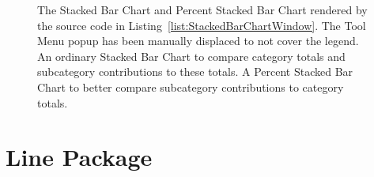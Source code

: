 \begin{figure}[tp]
\centering
{}
\hspace{1cm}
\caption[Stacked Bar Chart Window Example]{%
The Stacked Bar Chart and Percent Stacked Bar Chart rendered by the source
code in Listing~\ref{list:StackedBarChartWindow}. The Tool Menu popup has
been manually displaced to not cover the legend.
 An ordinary Stacked Bar Chart to
compare category totals and subcategory contributions to these totals.
 A Percent Stacked Bar Chart to
better compare subcategory contributions to category totals.
}
\label{fig:StackedBarChartWindow}
\end{figure}
  



\section{Line Package}

